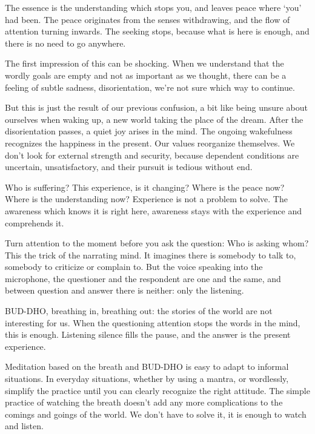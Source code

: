 The essence is the understanding which stops you, and leaves peace where
`you' had been. The peace originates from the senses withdrawing, and
the flow of attention turning inwards. The seeking stops, because what
is here is enough, and there is no need to go anywhere.


The first impression of this can be shocking. When we understand that
the wordly goals are empty and not as important as we thought, there can
be a feeling of subtle sadness, disorientation, we're not sure which way
to continue.

But this is just the result of our previous confusion, a bit like being
unsure about ourselves when waking up, a new world taking the place of
the dream. After the disorientation passes, a quiet joy arises in the
mind. The ongoing wakefulness recognizes the happiness in the present.
Our values reorganize themselves. We don't look for external strength
and security, because dependent conditions are uncertain,
unsatisfactory, and their pursuit is tedious without end.

Who is suffering? This experience, is it changing? Where is the peace
now? Where is the understanding now? Experience is not a problem to
solve. The awareness which knows it is right here, awareness stays with
the experience and comprehends it.

\enlargethispage*{\baselineskip}

Turn attention to the moment before you ask the question: Who is asking
whom? This the trick of the narrating mind. It imagines there is
somebody to talk to, somebody to criticize or complain to. But the voice
speaking into the microphone, the questioner and the respondent are one
and the same, and between question and answer there is neither: only the
listening.

\clearpage


BUD-DHO, breathing in, breathing out: the stories of the world are not
interesting for us. When the questioning attention stops the words in
the mind, this is enough. Listening silence fills the pause, and the
answer is the present experience.

Meditation based on the breath and BUD-DHO is easy to adapt to informal
situations. In everyday situations, whether by using a mantra, or
wordlessly, simplify the practice until you can clearly recognize the
right attitude. The simple practice of watching the breath doesn't add
any more complications to the comings and goings of the world. We don't
have to solve it, it is enough to watch and listen.

